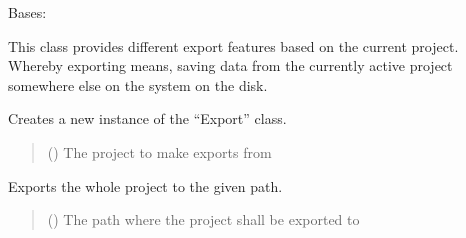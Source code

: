 \documentclass[letterpaper,10pt,english]{sphinxmanual}
\begin{document}
\begin{fulllineitems}
\label{\detokenize{apidoc/src.osm_configurator.model.project:src.osm_configurator.model.project.export.Export}}
\pysigstartsignatures
{}
\pysigstopsignatures
\sphinxAtStartPar
Bases: 

\sphinxAtStartPar
This class provides different export features based on the current project.
Whereby exporting means, saving data from the currently active project somewhere else on the system on the disk.

\begin{fulllineitems}
\label{\detokenize{apidoc/src.osm_configurator.model.project:src.osm_configurator.model.project.export.Export.__init__}}
\pysigstartsignatures
{}
\pysigstopsignatures
\sphinxAtStartPar
Creates a new instance of the “Export” class.
\begin{quote}\begin{description}
\sphinxAtStartPar
{} () \textendash{} The project to make exports from

\end{description}\end{quote}

\end{fulllineitems}


\begin{fulllineitems}
\label{\detokenize{apidoc/src.osm_configurator.model.project:src.osm_configurator.model.project.export.Export.export_project}}
\pysigstartsignatures
{}
\pysigstopsignatures
\sphinxAtStartPar
Exports the whole project to the given path.
\begin{quote}\begin{description}
\sphinxAtStartPar
{} () \textendash{} The path where the project shall be exported to


\end{description}
\end{quote}
\end{fulllineitems}
\end{fulllineitems}
\end{document}
